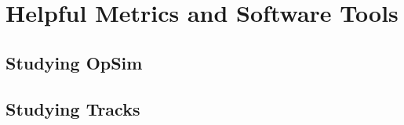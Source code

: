 \appendix
\section{Helpful Metrics and Software Tools}
\subsection{Studying OpSim}
\subsection{Studying Tracks}

